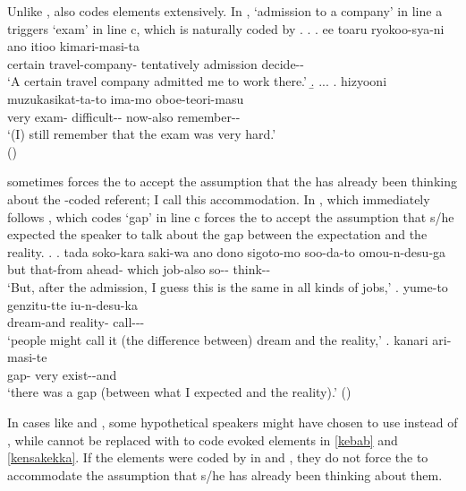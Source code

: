 Unlike ,
 also codes  elements extensively.
In \Next,
 `admission to a company' in line a triggers
 `exam' in line c,
which is naturally coded by .
%
\ex.\label{siken} \ag. ee toaru ryokoo-sya-ni ano itioo  kimari-masi-ta \\
		 certain travel-company-  tentatively admission decide-- \\
		`A certain travel company admitted me to work there.'
	\b. ...
	\bg. hizyooni  muzukasikat-ta-to ima-mo oboe-teori-masu \\
	very exam- difficult-- now-also remember-- \\
	`(I) still remember that the exam was very hard.' \\
\hfill{()}

 sometimes forces the  to accept the assumption that the  has already been thinking about the -coded referent;
I call this {accommodation}.
In \Next, which immediately follows \Last,
 which codes  `gap' in line c
forces the  to accept the assumption that s/he expected the speaker to talk about the gap between the expectation and the reality.
%
\ex. \ag. tada soko-kara saki-wa ano dono sigoto-mo soo-da-to omou-n-desu-ga \\
	but that-from ahead-  which job-also so-- think-- \\
	`But, after the admission, I guess this is the same in all kinds of jobs,'
	\bg. yume-to genzitu-tte iu-n-desu-ka \\
		dream-and reality- call--- \\
		`people might call it (the difference between) dream and the reality,'
	\bg.  kanari ari-masi-te \\
			gap- very exist--and \\
			`there was a gap (between what I expected and the reality).'
\hfill{()}

In cases like \LLast and \Last,
some hypothetical speakers might have chosen to use 
instead of ,
while  cannot be replaced with 
to code evoked elements in \ref{kebab} and \ref{kensakekka}.
If the elements were coded by  in \LLast and \Last,
they do not force the  to accommodate the assumption that s/he has already been thinking about them.

